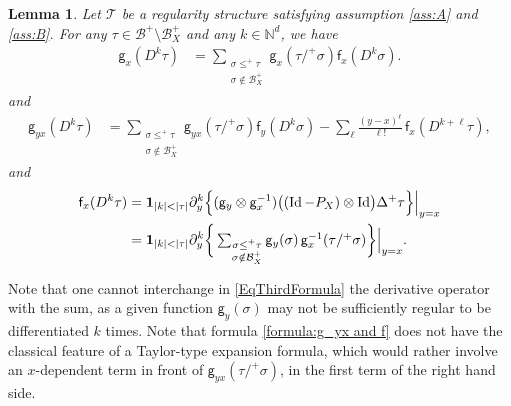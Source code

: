 \documentclass[11pt]{article}
\numberwithin{equation}{section}
\theoremstyle{plain}
\newtheorem{lem}[thm]{Lemma}
\theoremstyle{definition}
\DeclareMathOperator{\iden}{Id}
\newcommand{\sff}{\mathsf{f}}
\newcommand{\sfg}{\mathsf{g}}
\newcommand{\scrT}{\mathscr{T}}
\newcommand{\bbN}{\mathbb{N}}
\newcommand{\mcB}{\mathcal{B}}
\begin{document}
\begin{lem} \label{LemUsefulIdentities}
Let $\scrT$ be a regularity structure satisfying assumption \eqref{ass:A} and \eqref{ass:B}. For any $\tau\in\mcB^+\setminus\mcB_X^+$ and any $k\in\bbN^d$, we have
\begin{align} \label{formula:g_x and f_x}
\sfg_x(D^k\tau) &= \sum_{\substack{\sigma\leq^+\tau\\\sigma\notin\mcB_X^+}} \sfg_x(\tau/^+\sigma)\sff_x(D^k\sigma).
\end{align}
and
\begin{align} \label{formula:g_yx and f}
\sfg_{yx}(D^k\tau) &= \sum_{\substack{\sigma\leq^+\tau\\\sigma\notin\mcB_X^+}} \sfg_{yx}(\tau/^+\sigma)\sff_y(D^k\sigma) - \sum_{\ell}\frac{(y-x)^\ell}{\ell!}\,\sff_x(D^{k+\ell}\tau),
\end{align}
and
\begin{equation} \label{EqThirdFormula} \begin{split}
\sff_x(D^k\tau) &= {\bf1}_{|k|<|\tau|}\partial_y^k \Big\{({\sfg}_y\otimes\sfg_x^{-1}) \bigl((\iden -P_X)\otimes\iden \bigr) \Delta^+\tau\Big\}\Big|_{y=x} \\
 &= {\bf1}_{|k|<|\tau|}\partial_y^k \bigg\{
\textstyle\sum_{\substack{\sigma\leq^+\tau\\\sigma\notin\mcB_X^+}} \sfg_y(\sigma)\,\sfg_x^{-1}(\tau/^+\sigma)\bigg\}\Big|_{y=x}.
\end{split} \end{equation}
\end{lem}

Note that one cannot interchange in \eqref{EqThirdFormula} the derivative operator with the sum, as a given function ${\sfg}_y(\sigma)$ may not be sufficiently regular to be differentiated $k$ times. Note that formula \eqref{formula:g_yx and f} does not have the classical feature of a Taylor-type expansion formula, which would rather involve an $x$-dependent term in front of $\sfg_{yx}(\tau/^+\sigma)$, in the first term of the right hand side.
\end{document}

